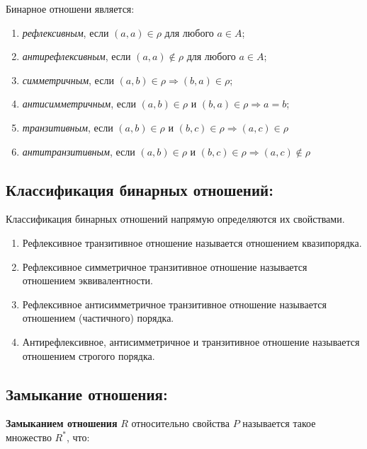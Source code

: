 \documentclass[spec, och, labwork]{shiza}
\begin{document}
        Бинарное отношени является:

        \begin{enumerate}
            \item \textit{рефлексивным}, если $(a, a) \in \rho$ для любого $a \in A$;
            \item \textit{антирефлексивным}, если $(a, a) \notin \rho$ для любого $a \in A$;
            \item \textit{симметричным}, если $(a, b) \in \rho \Rightarrow (b, a) \in \rho$;
            \item \textit{антисимметричным}, если $(a, b) \in \rho \text{ и } (b, a) \in \rho \Rightarrow a = b$;
            \item \textit{транзитивным}, если $(a, b) \in \rho \text{ и } (b, c) \in \rho \Rightarrow (a, c) \in \rho$
            \item \textit{антитранзитивным}, если $(a, b) \in \rho \text{ и } (b, c) \in \rho \Rightarrow (a, c) \notin \rho$
        \end{enumerate}

\subsection{Классификация бинарных отношений:}

        Классификация бинарных отношений напрямую определяются их свойствами.

        \begin{enumerate}
            \item Рефлексивное транзитивное отношение называется отношением квазипорядка.
            \item Рефлексивное симметричное транзитивное отношение называется отношением эквивалентности.
            \item Рефлексивное антисимметричное транзитивное отношение называется отношением (частичного) порядка.
            \item Антирефлексивное, антисимметричное и транзитивное отношение называется отношением строгого порядка.
        \end{enumerate}

\subsection{Замыкание отношения:}
        
        \textbf{Замыканием отношения} $R$ относительно свойства $P$ называется такое множество $R^*$, что:
        
\end{document}
